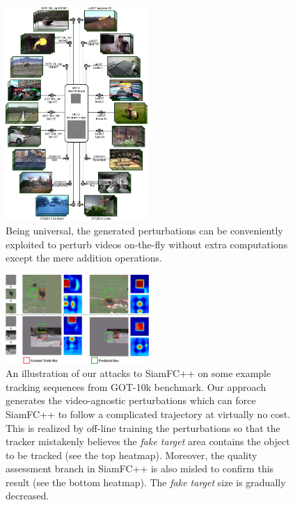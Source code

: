 \documentclass[journal]{IEEEtran}
\begin{document}
\begin{figure}[t]
  \centering
  \includegraphics[width=0.48\textwidth]{images_imperceptible/UAP.pdf}
  \caption{Being universal, the generated perturbations can be conveniently exploited to perturb videos on-the-fly without extra computations except the mere addition operations.} 
  \label{fig:UAP}
\end{figure}

\begin{figure}[t]
  \centering
  \includegraphics[width=0.485\textwidth]{images_imperceptible/1_v8.pdf}
  \caption{An illustration of our attacks to SiamFC++ on some example tracking sequences from GOT-10k benchmark. Our approach generates the video-agnostic perturbations which can force SiamFC++ to follow a complicated trajectory at virtually no cost. This is realized by off-line training the perturbations so that the tracker mistakenly believes the \textit{fake target} area contains the object to be tracked (see the top heatmap). Moreover, the quality assessment branch in SiamFC++ is also misled to confirm this result (see the bottom heatmap). The \textit{fake target} size is gradually decreased.} 
  \label{fig:1}
\end{figure}
\end{document}
